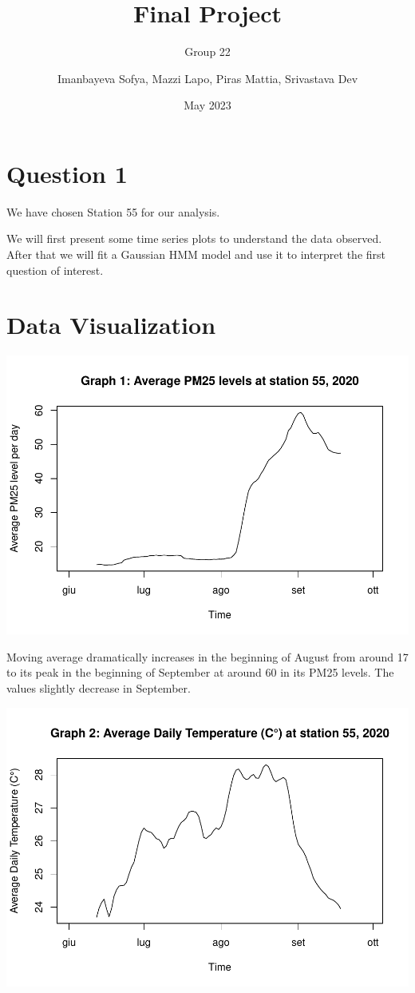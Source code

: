 \documentclass[
]{article}
\title{Final Project}
\subtitle{Group 22}
\author{Imanbayeva Sofya, Mazzi Lapo, Piras Mattia, Srivastava Dev}
\date{May 2023}
\begin{document}
\maketitle

\newpage

\newpage

\hypertarget{question-1}{%
\section{Question 1}\label{question-1}}

We have chosen Station 55 for our analysis.

We will first present some time series plots to understand the data
observed. After that we will fit a Gaussian HMM model and use it to
interpret the first question of interest.

\hypertarget{data-visualization}{%
\section{Data Visualization}\label{data-visualization}}

\begin{center}\includegraphics[width=0.75\linewidth,height=0.75\textheight]{finalproject_files/figure-latex/time series pm25-1} \end{center}

Moving average dramatically increases in the beginning of August from
around 17 to its peak in the beginning of September at around 60 in its
PM25 levels. The values slightly decrease in September.

\begin{center}\includegraphics[width=0.75\linewidth,height=0.75\textheight]{finalproject_files/figure-latex/ts temp-1} \end{center}
\end{document}
